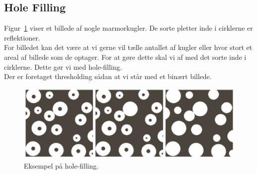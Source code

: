 \subsection{Hole Filling}

Figur~\ref{fig:hole-filling} viser et billede af nogle marmorkugler. De sorte pletter inde i cirklerne er reflektioner.\\

For billedet kan det være at vi gerne vil tælle antallet af kugler eller hvor stort et areal af billede som de optager. For at gøre dette skal vi af med det sorte inde i cirklerne. Dette gør vi med hole-filling.\\

Der er foretaget thresholding sådan at vi står med et binært billede.\\

\begin{figure}[H]
	\centering
	\includegraphics[width=\linewidth]{figs/spm10/hole-filling}
	\caption{Eksempel på hole-filling.}
	\label{fig:hole-filling}
\end{figure}

